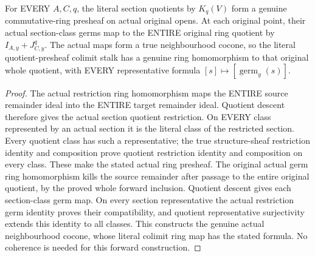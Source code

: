 \begin{definition}
\label{hir:real-domain-actual-remainder-quotient-ring-presheaf}
\leanok
For EVERY $A,C,q$, the literal section quotients by $K_q(V)$ form a genuine
commutative-ring presheaf on actual original opens. At each original point,
their actual section-class germs map to the ENTIRE original ring quotient
by $I_{A,y}+J_{C,y}^q$. The actual maps form a true neighbourhood cocone,
so the literal quotient-presheaf colimit stalk has a genuine ring
homomorphism to that original whole quotient, with EVERY representative
formula $[s]\mapsto[\operatorname{germ}_y(s)]$.
\end{definition}
\begin{proof}
The actual restriction ring homomorphism maps the ENTIRE source remainder
ideal into the ENTIRE target remainder ideal. Quotient descent therefore
gives the actual section quotient restriction. On EVERY class represented
by an actual section it is the literal class of the restricted section.
Every quotient class has such a representative; the true structure-sheaf
restriction identity and composition prove quotient restriction identity
and composition on every class. These make the stated actual ring
presheaf. The original actual germ ring homomorphism kills the source
remainder after passage to the entire original quotient, by the proved
whole forward inclusion. Quotient descent gives each section-class germ
map. On every section representative the actual restriction germ identity
proves their compatibility, and quotient representative surjectivity
extends this identity to all classes. This constructs the genuine actual
neighbourhood cocone, whose literal colimit ring map has the stated formula.
No coherence is needed for this forward construction.
\end{proof}

